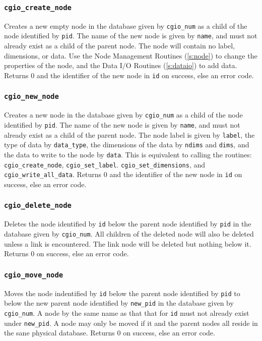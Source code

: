\subsubsection{\texttt{cgio\_create\_node}} \label{create_node}
    \noindent
    Creates a new empty node in the database given by \texttt{cgio\_num}
    as a child of the node identified by \texttt{pid}. The name of the new
    node is given by \texttt{name}, and must not already exist as a child
    of the parent node. The node will contain no label, dimensions,
    or data. Use the Node Management Routines (\autoref{s:node}) to
    change the properties of the node, and the
    Data I/O Routines (\autoref{s:dataio}) to add data. Returns 0 and the
    identifier of the new node in \texttt{id} on success, else an error code.

\subsubsection{\texttt{cgio\_new\_node}} \label{new_node}
    \noindent
    Creates a new node in the database given by \texttt{cgio\_num}
    as a child of the node identified by \texttt{pid}. The name of the new
    node is given by \texttt{name}, and must not already exist as a child
    of the parent node. The node label is given by \texttt{label},
    the type of data by \texttt{data\_type}, the dimensions of the data by
    \texttt{ndims} and \texttt{dims}, and the data to write to the node
    by \texttt{data}. This is equivalent to calling the routines:
    \texttt{cgio\_create\_node}, \texttt{cgio\_set\_label}.
    \texttt{cgio\_set\_dimensions}, and \texttt{cgio\_write\_all\_data}.
    Returns 0 and the identifier of the new node in \texttt{id} on success,
    else an error code.

\subsubsection{\texttt{cgio\_delete\_node}} \label{delete_node}
    \noindent
    Deletes the node identified by \texttt{id} below the parent node identified
    by \texttt{pid} in the database given by \texttt{cgio\_num}. All children
    of the deleted node will also be deleted unless a link is encountered.
    The link node will be deleted but nothing below it.
    Returns 0 on success, else an error code.

\subsubsection{\texttt{cgio\_move\_node}} \label{move_node}
    \noindent
    Moves the node indentified by \texttt{id} below the parent node identified
    by \texttt{pid} to below the new parent node identified by \texttt{new\_pid}
    in the database given by \texttt{cgio\_num}. A node by the same name as
    that that for \texttt{id} must not already exist under \texttt{new\_pid}.
    A node may only be moved if it and the parent nodes all reside in the
    sane physical database. Returns 0 on success, else an error code.

